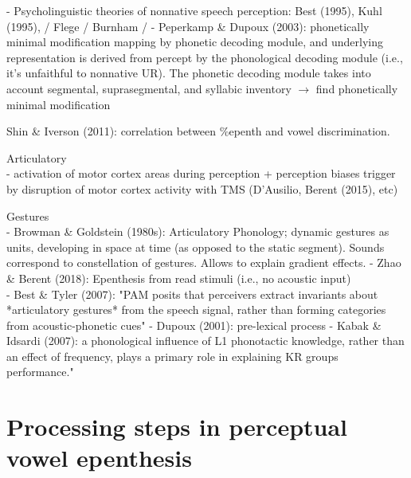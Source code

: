     - Psycholinguistic theories of nonnative speech perception: Best (1995), Kuhl (1995), / Flege / Burnham /  
    - Peperkamp \& Dupoux (2003): phonetically minimal modification mapping by phonetic decoding module, and underlying representation is derived from percept by the phonological decoding module (i.e., it's unfaithful to nonnative UR). The phonetic decoding module takes into account segmental, suprasegmental, and syllabic inventory $\rightarrow$ find phonetically minimal modification \\

  \item Shin \& Iverson (2011): correlation between \%epenth and vowel discrimination.   
  \item Articulatory \\
    - activation of motor cortex areas during perception + perception biases trigger by disruption of motor cortex activity with TMS (D'Ausilio, Berent (2015), etc)
  \item Gestures \\
    - Browman \& Goldstein (1980s): Articulatory Phonology; dynamic gestures as units, developing in space at time (as opposed to the static segment). Sounds correspond to constellation of gestures. Allows to explain gradient effects.  
    - Zhao \& Berent (2018): Epenthesis from read stimuli (i.e., no acoustic input) \\
    - Best \& Tyler (2007): "PAM posits that perceivers extract invariants about *articulatory gestures* from the speech signal, rather than forming categories from acoustic-phonetic cues"
    - Dupoux (2001): pre-lexical process 
    - Kabak & Idsardi (2007): a phonological influence of L1 phonotactic knowledge, rather than an effect of frequency, plays a primary role in explaining KR groups performance."


\section{Processing steps in perceptual vowel epenthesis}

